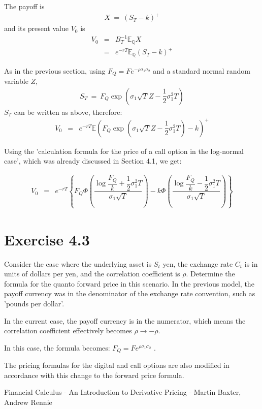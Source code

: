\documentclass[uplatex,a4j,12pt,dvipdfmx]{jsarticle}
\begin{document}
The payoff is
%
%
\begin{eqnarray}
	X
	\ = \
	( S_{T} - k )^{+}
\end{eqnarray}
%
%
and its present value $V_{0}$ is
%
%
\begin{eqnarray}
	V_{0}
	& = &
	B^{-1}_{T}
	\mathbb{E}_{\mathbb{Q}}
	X
	\\ & = &
	e^{-rT}
	\mathbb{E}_{\mathbb{Q}}
	( S_{T} - k  )^{+}
\end{eqnarray}
%
%

As in the previous section, using
$
	F_{Q} = F e^{- \rho \sigma_{1} \sigma_{2} }
$
and a standard normal random variable $Z$,
%
%
\begin{eqnarray}
	S_{T}
	\ = \
	F_{Q}
	\exp \left( \sigma_{1} \sqrt{T} Z -
	\dfrac{1}{2} \sigma_{1}^{2} T
	\right)
\end{eqnarray}
%
%
$S_T$ can be written as above, therefore:
%
%
\begin{eqnarray}
	V_{0}
	& = &
	e^{-rT}
	\mathbb{E}
	\left(
	F_{Q}
	\exp \left( \sigma_{1} \sqrt{T} Z -
	\dfrac{1}{2} \sigma_{1}^{2} T
	\right)
	- k
	\right)^{+}
\end{eqnarray}
%
%

Using the 'calculation formula for the price of a call option in the log-normal case', which was already discussed in Section 4.1, we get:

%
%
\begin{eqnarray}
	V_{0}
	&=&
	e^{-rT}
	\left\{
	F_{Q}
	\Phi
	\left(
	\dfrac{
		\log
		\dfrac{F_{Q}}{k}
		+
		\dfrac{1}{2} \sigma_{1}^{2} T
	}{\sigma_{1} \sqrt{T}}
	\right)
	-
	k
	\Phi
	\left(
	\dfrac{
		\log
		\dfrac{F_{Q}}{k}
		-
		\dfrac{1}{2} \sigma_{1}^{2} T
	}{\sigma_{1} \sqrt{T}}
	\right)
	\right\}
\end{eqnarray}
%
%


\section{Exercise 4.3}
Consider the case where the underlying asset is $S_{t}$ yen,
the exchange rate $C_{t}$ is in units of dollars per yen,
and the correlation coefficient is $\rho$. Determine the formula for the quanto forward price in this scenario.
In the previous model, the payoff currency was in the denominator of the exchange rate convention, such as 'pounds per dollar'.

In the current case, the payoff currency is in the numerator,
which means the correlation coefficient effectively becomes
$\rho \to - \rho$.

In this case, the formula becomes:
$
	F_{Q}
	=
	F
	e^{\rho \sigma_{1} \sigma_{2}}
$
.

The pricing formulas for the digital and call options are also modified in accordance with this change to the forward price formula.

\begin{thebibliography}{9}
	Financial Calculus - An Introduction to Derivative Pricing - Martin Baxter, Andrew Rennie
\end{thebibliography}
\end{document}
